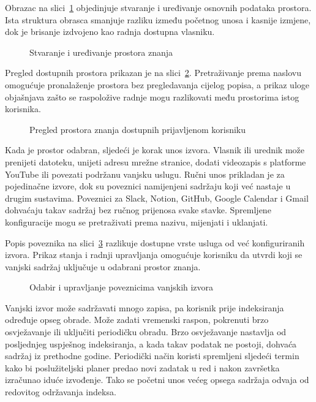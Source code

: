 Obrazac na slici~\ref{fig:uredivanje-prostora} objedinjuje stvaranje i uređivanje osnovnih podataka prostora. Ista struktura obrasca smanjuje razliku između početnog unosa i kasnije izmjene, dok je brisanje izdvojeno kao radnja dostupna vlasniku.

\begin{figure}[H]
    \centering
    \caption{Stvaranje i uređivanje prostora znanja}
    \label{fig:uredivanje-prostora}
\end{figure}

Pregled dostupnih prostora prikazan je na slici~\ref{fig:prostori-znanja}. Pretraživanje prema naslovu omogućuje pronalaženje prostora bez pregledavanja cijelog popisa, a prikaz uloge objašnjava zašto se raspoložive radnje mogu razlikovati među prostorima istog korisnika.

\begin{figure}[H]
    \centering
    \caption{Pregled prostora znanja dostupnih prijavljenom korisniku}
    \label{fig:prostori-znanja}
\end{figure}

Kada je prostor odabran, sljedeći je korak unos izvora. Vlasnik ili urednik može prenijeti datoteku, unijeti adresu mrežne stranice, dodati videozapis s platforme YouTube ili povezati podržanu vanjsku uslugu. Ručni unos prikladan je za pojedinačne izvore, dok su poveznici namijenjeni sadržaju koji već nastaje u drugim sustavima. Poveznici za Slack, Notion, GitHub, Google Calendar i Gmail dohvaćaju takav sadržaj bez ručnog prijenosa svake stavke. Spremljene konfiguracije mogu se pretraživati prema nazivu, mijenjati i uklanjati.

Popis poveznika na slici~\ref{fig:poveznici} razlikuje dostupne vrste usluga od već konfiguriranih izvora. Prikaz stanja i radnji upravljanja omogućuje korisniku da utvrdi koji se vanjski sadržaj uključuje u odabrani prostor znanja.

\begin{figure}[H]
    \centering
    \caption{Odabir i upravljanje poveznicima vanjskih izvora}
    \label{fig:poveznici}
\end{figure}

Vanjski izvor može sadržavati mnogo zapisa, pa korisnik prije indeksiranja određuje opseg obrade. Može zadati vremenski raspon, pokrenuti brzo osvježavanje ili uključiti periodičku obradu. Brzo osvježavanje nastavlja od posljednjeg uspješnog indeksiranja, a kada takav podatak ne postoji, dohvaća sadržaj iz prethodne godine. Periodički način koristi spremljeni sljedeći termin kako bi poslužiteljski planer predao novi zadatak u red i nakon završetka izračunao iduće izvođenje. Tako se početni unos većeg opsega sadržaja odvaja od redovitog održavanja indeksa.

